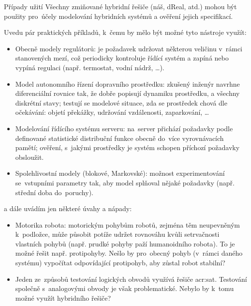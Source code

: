 \documentclass[thesis=M,czech]{FITthesis}[2012/06/26]
\newcommand{\acrlabel}[1]{acr:#1}
\newcommand{\acr}[1]{\acrshort{\acrlabel{#1}}}
\begin{document}
\begin{section}{Případy užití}\label{s:exp:use_case}
Všechny zmiňované hybridní řešiče
(náš, dReal, atd.)
mohou být použity pro~účely modelování hybridních systémů
a ověření jejich specifikací.

Uvedu pár praktických příkladů,
k~čemu by mělo být možné tyto nástroje využít:
\begin{itemize}
\item Obecně modely regulátorů:
   je požadavek udržovat některou veličinu
   v~rámci stanovených mezí,
   což periodicky kontroluje řídící systém
   a zapíná nebo vypíná regulaci
   (např. termostat, vodní nádrž, \dots).
\item Model autonomního řízení dopravního prostředku:
   zkušený inženýr navrhne diferenciální rovnice tak,
   že dobře popisují dynamiku prostředku,
   a všechny diskrétní stavy;
   testují se modelové situace,
   zda se prostředek chová dle očekávání:
   objetí překážky, udržování vzdálenosti,
   zaparkování, \dots
\item Modelování řídícího systému serveru:
   na~server přichází požadavky podle
   definované statistické distribuční funkce
   obecně do~více vyrovnávacích pamětí;
   ověření, s~jakými prostředky je systém schopen
   příchozí požadavky obsloužit.
\item Spolehlivostní modely (blokové, Markovské):
   možnost experimentování se~vstupními parametry tak,
   aby model splňoval nějaké požadavky
   (např. střední doba do~poruchy).
\end{itemize}
a dále uvádím jen některé úvahy a nápady:
\begin{itemize}
\item Motorika robota:
   motorickým pohybům robotů,
   zejména těm neupevněným k~podložce,
   může působit potíže udržet rovnováhu
   kvůli setrvačnosti vlastních pohybů
   (např. prudké pohyby paží humanoidního robota).
   To je možné řešit např. protipohyby.
   Nešlo by pro~obecný pohyb (v~rámci daného systému)
   vypočítat odpovídající protipohyb, aby zůstal robot stabilní?
\item Jeden ze~způsobů testování logických obvodů
   využívá řešiče \acr{sat}. Testování společně s~analogovými obvody
   je však problematické. Nebylo by k~tomu možné využít hybridního řešiče?
\end{itemize}
\end{section} %

\end{document}
